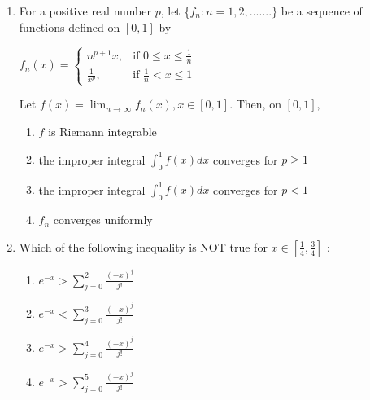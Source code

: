 \documentclass[journal]{IEEEtran}
\theoremstyle{remark}
\begin{document}
\begin{enumerate}
                \item For a positive real number $p$, let \{$f_n : n=1,2,.......\}$ be a sequence of functions defined on $[0,1]$ by 
                \begin{center}
                   $ f_n(x) = \begin{cases}
                    n^{p+1}x, & \text{if }  0 \leq x \leq \frac{1}{n} \\
                    \frac{1}{x^p}, & \text{if }  \frac{1}{n} < x \leq 1
                    \end{cases} $
                \end{center}
                Let $f(x) = \lim_{n \to \infty} f_n(x), x \in [0, 1]$. Then, on $[0,1],$ 
                \begin{enumerate}
                    \item $f$ is Riemann integrable
                    \item the improper integral $\int_{0}^{1} f(x) dx$ converges for $p\ge 1$
                    \item the improper integral $\int_{0}^{1} f(x) dx$ converges for $p<1$
                    \item $f_n$ converges uniformly 
                \end{enumerate}

                \item Which of the following inequality is NOT true for $x \in [\frac{1}{4}, \frac{3}{4}]$ :
                \begin{multicols}{2}
                \begin{enumerate}
                    
                      \item $e^{-x} > \sum_{j=0}^{2} \frac{(-x)^j}{j!}$
                      \item $e^{-x} < \sum_{j=0}^{3} \frac{(-x)^j}{j!}$
                       \item $e^{-x} > \sum_{j=0}^{4} \frac{(-x)^j}{j!}$
                       \item $e^{-x} > \sum_{j=0}^{5} \frac{(-x)^j}{j!}$
                \end{enumerate}
                    
                \end{multicols}


\end{enumerate}
\end{document}
